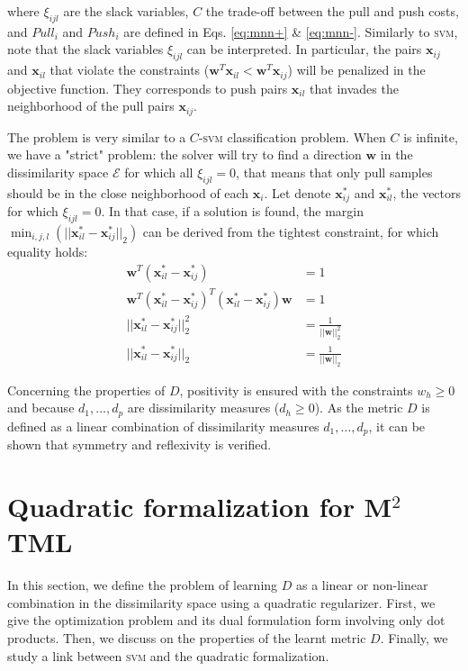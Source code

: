 \noindent where $\xi_{ijl}$ are the slack variables, $C$ the trade-off between the pull and push costs, and $Pull_i$ and $Push_i$ are defined in Eqs. \ref{eq:mnn+} \& \ref{eq:mnn-}. Similarly to \textsc{svm}, note that the slack variables $\xi_{ijl}$ can be interpreted. In particular, the pairs $\textbf{x}_{ij}$ and $\textbf{x}_{il}$ that violate the constraints ($\textbf{w}^T \textbf{x}_{il} < \textbf{w}^T \textbf{x}_{ij}$) will be penalized in the objective function. They corresponds to push pairs $\textbf{x}_{il}$ that invades the neighborhood of the pull pairs $\textbf{x}_{ij}$.

The problem is very similar to a $C$-\textsc{svm} classification problem. When $C$ is infinite, we have a "strict" problem: the solver will try to find a direction $\textbf{w}$ in the dissimilarity space $\mathcal{E}$ for which all $\xi_{ijl} = 0$, that means that only pull samples should be in the close neighborhood of each $\textbf{x}_i$. Let denote $\textbf{x}_{ij}^*$ and $\textbf{x}_{il}^*$, the vectors for which $\xi_{ijl} = 0$. In that case, if a solution is found, the margin $\displaystyle  \min_{i,j,l}(||\textbf{x}_{il}^* - \textbf{x}_{ij}^*||_2)$ can be derived from the tightest constraint, for which equality holds:
\begin{align*}
	\textbf{w}^T(\textbf{x}_{il}^* - \textbf{x}_{ij}^*) & = 1 \\
	\textbf{w}^T(\textbf{x}_{il}^* - \textbf{x}_{ij}^*)^T(\textbf{x}_{il}^* - \textbf{x}_{ij}^*)\textbf{w} & = 1 \\
	||\textbf{x}_{il}^* - \textbf{x}_{ij}^*||_2^2 & = \frac{1}{||\textbf{w}||_2^2} \\
	||\textbf{x}_{il}^* - \textbf{x}_{ij}^*||_2 & = \frac{1}{||\textbf{w}||_2}
\end{align*} 

\noindent Concerning the properties of $D$, positivity is ensured with the constraints $w_h \geq 0$ and because $d_1, \ldots, d_p$ are dissimilarity measures ($d_h \geq 0$). As the metric $D$ is defined as a linear combination of dissimilarity measures $d_1, \ldots, d_p$, it can be shown that symmetry and reflexivity is verified.

\section{Quadratic formalization for M$^2$TML}
In this section, we define the problem of learning $D$ as a linear or non-linear combination in the dissimilarity space using a quadratic regularizer. First, we give the optimization problem and its dual formulation form involving only dot products. Then, we discuss on the properties of the learnt metric $D$. Finally, we study a link between \textsc{svm} and the quadratic formalization. \\

